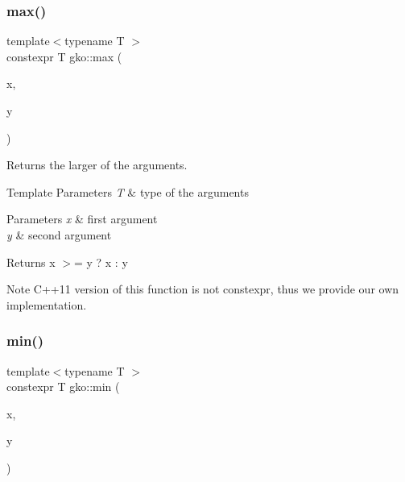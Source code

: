 \mbox{\label{namespacegko_af1812df45c6ec07780d579a12b64c753}} 
\subsubsection{\texorpdfstring{max()}{max()}}
{\footnotesize\ttfamily template$<$typename T $>$ \\
constexpr T gko\+::max (\begin{DoxyParamCaption}\item[{const T \&}]{x,  }\item[{const T \&}]{y }\end{DoxyParamCaption})\hspace{0.3cm}{\ttfamily [inline]}}



Returns the larger of the arguments. 


\begin{DoxyTemplParams}{Template Parameters}
{\em T} & type of the arguments\\
\hline
\end{DoxyTemplParams}

\begin{DoxyParams}{Parameters}
{\em x} & first argument \\
\hline
{\em y} & second argument\\
\hline
\end{DoxyParams}
\begin{DoxyReturn}{Returns}
x $>$= y ? x \+: y
\end{DoxyReturn}
\begin{DoxyNote}{Note}
C++11 version of this function is not constexpr, thus we provide our own implementation. 
\end{DoxyNote}
\mbox{\label{namespacegko_aaaf8487194bcb40b528969c187a413a0}} 
\subsubsection{\texorpdfstring{min()}{min()}}
{\footnotesize\ttfamily template$<$typename T $>$ \\
constexpr T gko\+::min (\begin{DoxyParamCaption}\item[{const T \&}]{x,  }\item[{const T \&}]{y }\end{DoxyParamCaption})\hspace{0.3cm}{\ttfamily [inline]}}



